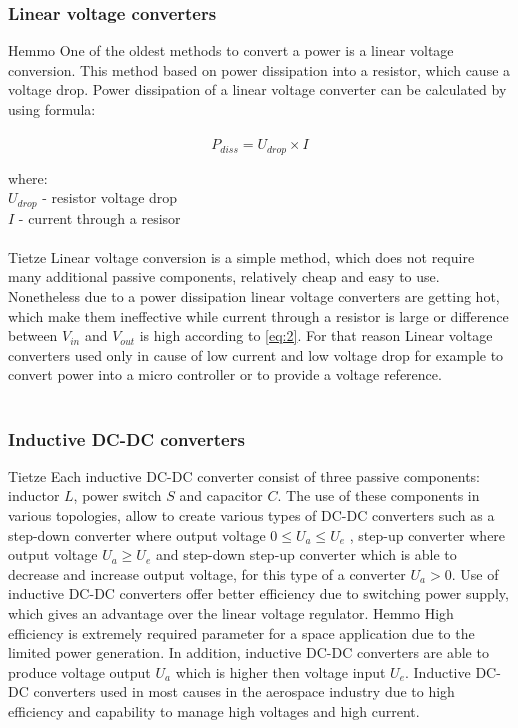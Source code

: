 \subsubsection{Linear voltage converters \label{sec:tech}}

Hemmo\cite{18} One of the oldest methods to convert a power is a linear voltage conversion. This method based on power dissipation into a resistor, which cause a voltage drop. Power dissipation of a linear voltage converter can be calculated by using formula:\\ \\

\begin{equation}\label{eq:2}
P_{diss}=U_{drop} \times I
\end{equation}


where:\\
$U_{drop}$ - resistor voltage drop\\
$I$ - current through a resisor\\ \\
 Tietze \cite{18} Linear voltage conversion is a simple method, which does not require many additional passive components, relatively cheap and easy to use. Nonetheless due to a power dissipation linear voltage converters are getting hot, which make them ineffective while current through a resistor is large or difference between $V_{in}$ and $V_{out}$ is high according to \eqref{eq:2}. For that reason Linear voltage converters used only in cause of low current and low voltage drop for example to convert power into a micro controller or to provide a voltage reference.\\
 \\
 
 
\subsubsection{Inductive DC-DC converters \label{sec:tech}}

Tietze\cite{18} Each inductive DC-DC converter consist of three passive components: inductor $L$, power switch $S$ and capacitor $C$. The use of these components in various topologies, allow to create various types of DC-DC converters such as a step-down converter where output voltage $0 \leq U_{a} \leq U_{e} $ , step-up converter where output voltage $U_{a} \geq U_{e} $  and   step-down step-up converter which is able to decrease and increase output voltage, for this type of a converter $ U_{a} > 0$. Use of inductive DC-DC converters offer better efficiency due to switching power supply, which gives an advantage over the linear voltage regulator. Hemmo\cite{17} High efficiency is extremely required parameter for a space application due to the limited power generation. In addition, inductive DC-DC converters are able to produce  voltage output $U_{a}$ which is higher then voltage input $U_{e}$. Inductive DC-DC converters used in most causes in the aerospace industry due to high efficiency and capability to manage high voltages and high current.

